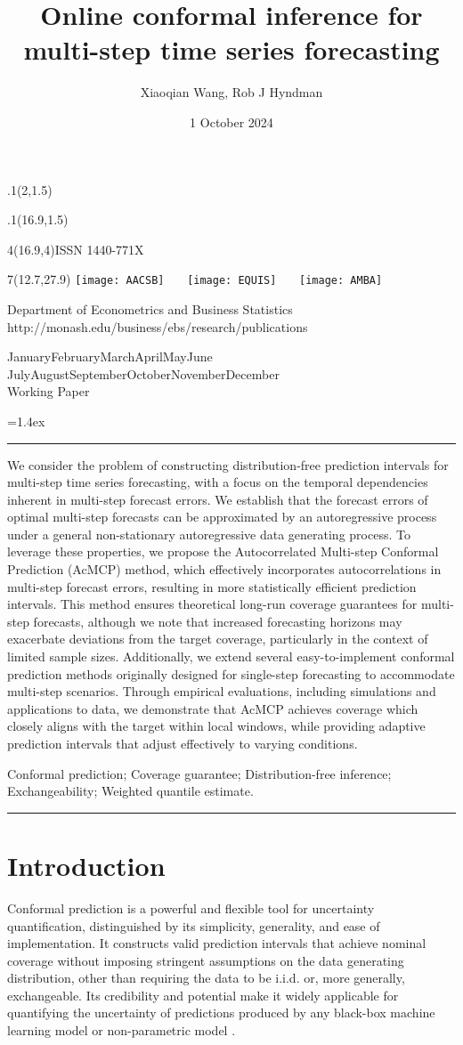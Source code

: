\documentclass[
  11pt,
  a4paper,
]{article}
\title{Online conformal inference for multi-step time series
forecasting}
\date{1 October 2024}
\author{Xiaoqian Wang, Rob J Hyndman}
\makeatletter
\theoremstyle{plain}
\theoremstyle{remark}
\def\placefig#1#2#3#4{\begin{textblock}{.1}(#1,#2)\rlap{\texttt{[image: \#4]}}\end{textblock}}
\def\Date{\number\day}
\def\Month{\ifcase\month\or
 January\or February\or March\or April\or May\or June\or
 July\or August\or September\or October\or November\or December\fi}
\def\Year{\number\year}
\def\showjel{{\large\textsf{\textbf{JEL classification:}}~\@jel}}
\def\cover{{\sffamily\setcounter{page}{0}
        \thispagestyle{empty}
        \placefig{2}{1.5}{width=5cm}{monash2}
        \placefig{16.9}{1.5}{width=2.1cm}{MBSportrait}
        \begin{textblock}{4}(16.9,4)ISSN 1440-771X\end{textblock}
        \begin{textblock}{7}(12.7,27.9)\hfill
        \texttt{[image: AACSB]}~~~
        \texttt{[image: EQUIS]}~~~
        \texttt{[image: AMBA]}
        \end{textblock}
        \vspace*{2.5cm}
        \begin{center}\Large
        Department of Econometrics and Business Statistics\\[.5cm]
        \footnotesize http://monash.edu/business/ebs/research/publications
        \end{center}\vspace{2cm}
        \begin{center}
        \fbox{\parbox{14cm}{\begin{onehalfspace}\centering\Huge\vspace*{0.3cm}
                \textsf{\textbf{\expandafter{\@title}}}\vspace{1cm}\par
                \LARGE
                \expandafter{\@author}
                \end{onehalfspace}
        }}
        \end{center}
        \vfill
                \begin{center}\Large
                \Month~\Year\\[1cm]
                Working Paper \@wp
        \end{center}\vspace*{2cm}}}
\def\pageone{{\sffamily\setstretch{1}%
        \thispagestyle{empty}%
        \vbox to \textheight{%
        \raggedright\baselineskip=1.2cm
     {\fontsize{24.88}{30}\sffamily\textbf{\expandafter{\@title}}}
        \vspace{2cm}\par
        \hspace{1cm}\parbox{14cm}{\sffamily\large\@addresses}\vspace{1cm}\vfill
        \hspace{1cm}{\large\Date~\Month~\Year}\\[1cm]
        \hspace{1cm}\showjel\vss}}}
\def\blindtitle{{\sffamily
     \thispagestyle{plain}\raggedright\baselineskip=1.2cm
     {\fontsize{24.88}{30}\sffamily\textbf{\expandafter{\@title}}}\vspace{1cm}\par
        }}
\def\titlepage{{\cover\newpage\pageone\newpage\blindtitle}}
\let\maketitle\titlepage
\newenvironment{keywords}{\par\vspace{0.5cm}\noindent{\sffamily\textbf{Keywords:}}}{\vspace{0.25cm}\par\hrule\vspace{0.5cm}\par}
\renewenvironment{abstract}{\begin{minipage}{\textwidth}\parskip=1.4ex\noindent
\hrule\vspace{0.1cm}\par{\sffamily\textbf{\abstractname}}\newline\setstretch{1.1}}
  {\end{minipage}}
\makeatother
\begin{document}
\maketitle

\begin{abstract}
We consider the problem of constructing distribution-free prediction
intervals for multi-step time series forecasting, with a focus on the
temporal dependencies inherent in multi-step forecast errors. We
establish that the forecast errors of optimal multi-step forecasts can
be approximated by an autoregressive process under a general
non-stationary autoregressive data generating process. To leverage these
properties, we propose the Autocorrelated Multi-step Conformal
Prediction (AcMCP) method, which effectively incorporates
autocorrelations in multi-step forecast errors, resulting in more
statistically efficient prediction intervals. This method ensures
theoretical long-run coverage guarantees for multi-step forecasts,
although we note that increased forecasting horizons may exacerbate
deviations from the target coverage, particularly in the context of
limited sample sizes. Additionally, we extend several easy-to-implement
conformal prediction methods originally designed for single-step
forecasting to accommodate multi-step scenarios. Through empirical
evaluations, including simulations and applications to data, we
demonstrate that AcMCP achieves coverage which closely aligns with the
target within local windows, while providing adaptive prediction
intervals that adjust effectively to varying conditions.
\end{abstract}

\begin{keywords}
  Conformal prediction; Coverage guarantee; Distribution-free
inference; Exchangeability; 
  Weighted quantile estimate.
\end{keywords}


\section{Introduction}\label{sec-intro}

Conformal prediction \autocite{vovk2005} is a powerful and flexible tool
for uncertainty quantification, distinguished by its simplicity,
generality, and ease of implementation. It constructs valid prediction
intervals that achieve nominal coverage without imposing stringent
assumptions on the data generating distribution, other than requiring
the data to be i.i.d. or, more generally, exchangeable. Its credibility
and potential make it widely applicable for quantifying the uncertainty
of predictions produced by any black-box machine learning model
\autocite{shafer2008,papadopoulos2008,barber2021} or non-parametric
model \autocite{lei2014}.
\end{document}
